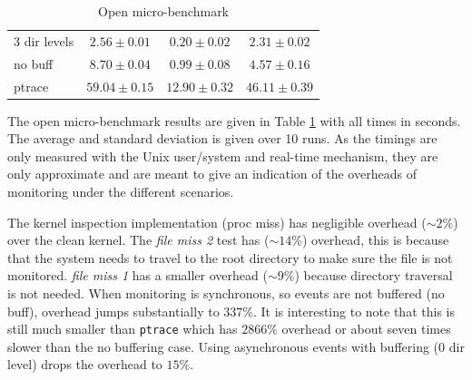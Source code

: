 \begin{table}
\begin{tabular}{ | l || c | c | c | }
3 dir levels & \begin{math} 2.56\pm0.01 \end{math} & \begin{math} 0.20\pm0.02 \end{math} & \begin{math} 2.31\pm0.02 \end{math} \\
no buff & \begin{math} 8.70\pm0.04 \end{math} & \begin{math} 0.99\pm0.08 \end{math} & \begin{math} 4.57\pm0.16 \end{math} \\
ptrace & \begin{math} 59.04\pm0.15 \end{math} & \begin{math} 12.90\pm0.32 \end{math} & \begin{math} 46.11\pm0.39 \end{math} \\
\hline
\end{tabular}
\caption{Open micro-benchmark}
\label{tab-open}
\end{table}

The open micro-benchmark results are given in Table \ref{tab-open}
with all times in seconds. The average and standard deviation
is given over 10 runs.
As the timings are only measured with the Unix user/system and real-time
mechanism, they are only approximate and are meant
to give an indication of the overheads of monitoring
under the different scenarios.

The kernel inspection implementation (proc miss) has negligible overhead
($\sim 2\%$) over the clean kernel.
The {\em file miss 2} test has ($\sim 14\%$) overhead, this is because that
the system needs to travel to the root directory to make sure the file is
not monitored.
{\em file miss 1} has a smaller overhead ($\sim 9\%$) because directory
traversal is not needed.
When monitoring is synchronous, so events are not buffered (no buff),
overhead jumps substantially to $337\%$.
It is interesting to note that this is still much smaller than {\tt ptrace}
which has $2866\%$ overhead or about seven times slower than the
no buffering case.
Using asynchronous events with buffering (0 dir level) 
drops the overhead to $15\%$.

